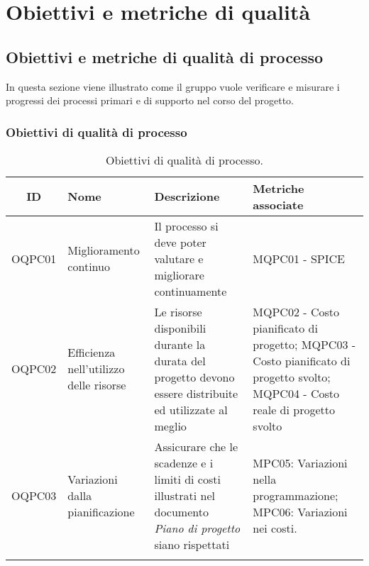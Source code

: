 \section{Obiettivi e metriche di qualità}
\subsection{Obiettivi e metriche di qualità di processo}
In questa sezione viene illustrato come il gruppo vuole verificare e misurare i progressi dei processi primari e di supporto nel corso del progetto. 
\subsubsection{Obiettivi di qualità di processo}
\begin{table}[H]
	\centering
	\begin{tabularx}{\textwidth}{|c|X|X|X|}
	\hline
	\textbf{ID} & \textbf{Nome} & \textbf{Descrizione} & \textbf{Metriche associate}\\
	\hline
	OQPC01 & Miglioramento continuo & Il processo si deve poter valutare e migliorare continuamente & MQPC01 - SPICE\\
	\hline
	OQPC02 & Efficienza nell'utilizzo delle risorse & Le risorse disponibili durante la durata del progetto devono essere distribuite ed utilizzate al meglio & MQPC02 - Costo pianificato di progetto; MQPC03 - Costo pianificato di progetto svolto; \hspace{25pt} MQPC04 - Costo reale di progetto svolto \\
	\hline
	OQPC03 & Variazioni dalla pianificazione & Assicurare che le scadenze e i limiti di costi illustrati nel documento \textit{Piano di progetto} siano rispettati &  MPC05: Variazioni nella programmazione;\hspace{65pt} MPC06: Variazioni nei costi. \\
	\hline
	\caption{Obiettivi di qualità di processo.}
	\end{tabularx}
\end{table}

